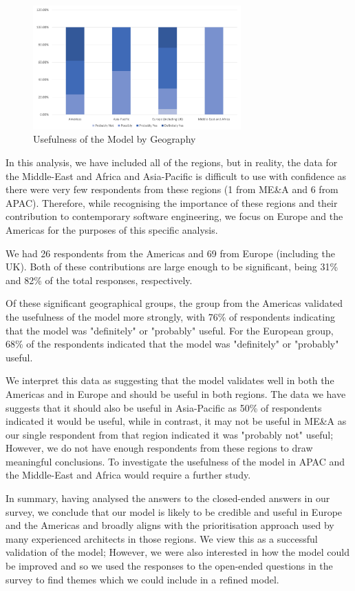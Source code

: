 \begin{figure}
\centering
\includegraphics[width=8cm,trim={2 2 2 2},clip]{Figures/prioritisation-usefulness-by-geo}
\caption{Usefulness of the Model by Geography}
\label{figure:usefulnessbygeo}
\end{figure}

In this analysis, we have included all of the regions, but in reality, the data for the Middle-East and Africa and Asia-Pacific is difficult to use with confidence as there were very few respondents from these regions (1 from ME\&A and 6 from APAC).  Therefore, while recognising the importance of these regions and their contribution to contemporary software engineering, we focus on Europe and the Americas for the purposes of this specific analysis.

We had 26 respondents from the Americas and 69 from Europe (including the UK).  Both of these contributions are large enough to be significant, being 31\% and 82\% of the total responses, respectively.

Of these significant geographical groups, the group from the Americas validated the usefulness of the model more strongly, with 76\% of respondents indicating that the model was "definitely" or "probably" useful.  For the European group, 68\% of the respondents indicated that the model was "definitely" or "probably" useful.

We interpret this data as suggesting that the model validates well in both the Americas and in Europe and should be useful in both regions.  The data we have suggests that it should also be useful in Asia-Pacific as 50\% of respondents indicated it would be useful, while in contrast, it may not be useful in ME\&A as our single respondent from that region indicated it was "probably not" useful; However, we do not have enough respondents from these regions to draw meaningful conclusions.  To investigate the usefulness of the model in APAC and the Middle-East and Africa would require a further study.

In summary, having analysed the answers to the closed-ended answers in our survey, we conclude that our model is likely to be credible and useful in Europe and the Americas and broadly aligns with the prioritisation approach used by many experienced architects in those regions.
We view this as a successful validation of the model; However, we were also interested in how the model could be improved and so we used the responses to the open-ended questions in the survey to find themes which we could include in a refined model.


